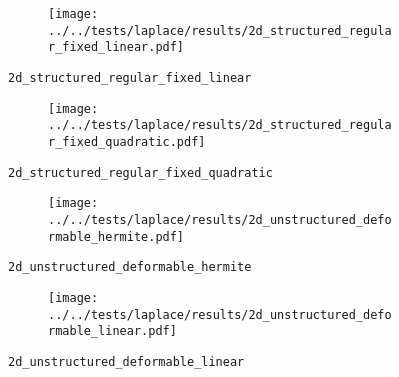 %
%
\begin{frame}{}
  \vspace*{-0.2cm}
  \begin{figure}[h!]
    \begin{subfigure}[t]{0.48\textwidth}%
      \centering%
      \texttt{[image: ../../tests/laplace/results/2d\_structured\_regular\_fixed\_linear.pdf]}%
    \end{subfigure}%
    \caption{\lstinline{2d_structured_regular_fixed_linear}}
  \end{figure}
\end{frame}
%
%
\begin{frame}{}
  \vspace*{-0.2cm}
  \begin{figure}[h!]
    \begin{subfigure}[t]{0.48\textwidth}%
      \centering%
      \texttt{[image: ../../tests/laplace/results/2d\_structured\_regular\_fixed\_quadratic.pdf]}%
    \end{subfigure}%
    \caption{\lstinline{2d_structured_regular_fixed_quadratic}}
  \end{figure} 
\end{frame}
%
%
\begin{frame}{}
  \vspace*{-0.2cm}
  \begin{figure}[h!]
    \begin{subfigure}[t]{0.48\textwidth}%
      \centering%
      \texttt{[image: ../../tests/laplace/results/2d\_unstructured\_deformable\_hermite.pdf]}%
    \end{subfigure}%
    \caption{\lstinline{2d_unstructured_deformable_hermite}}
  \end{figure}
\end{frame}
%
%
\begin{frame}{}
  \vspace*{-0.2cm}
  \begin{figure}[h!]
    \begin{subfigure}[t]{0.48\textwidth}%
      \centering%
      \texttt{[image: ../../tests/laplace/results/2d\_unstructured\_deformable\_linear.pdf]}%
    \end{subfigure}%
    \caption{\lstinline{2d_unstructured_deformable_linear}}
  \end{figure}
\end{frame}
